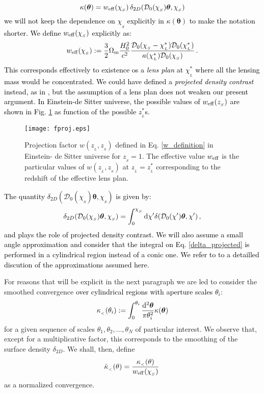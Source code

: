 \documentclass[twocolumn,aps,reprint, nofootinbib]{revtex4}
\newcommand{\Omegam}{{\Omega_\mathrm{m}}}
\newcommand{\dd}{{\rm d}}
\newcommand{\eff}{{\rm eff}}
\newcommand{\w}{{w_{\eff}}}
\newcommand{\bfth}{{\boldsymbol{\theta}}}
\newcommand{\hkappa}{\hat{\kappa}_{_<}}
\newcommand{\mD}{{\mathcal{D}_0}}
\newcommand{\pr}[1]{{\textcolor{black}{\textit{} #1}}}
\begin{document}
\begin{equation}
\label{kappa_tvm}
\kappa(\bfth) =  \w(\chi_{_S}) \, \delta_{2D}(\mD(\chi_{_S}) \bfth, \chi_{_S})
\end{equation}
\pr{we will not keep the dependence on $\chi_{_S}$ explicitly in $\kappa(\bfth)$  to make the notation shorter. We define $\w(\chi_{_S})$ explicitly as:}
\begin{equation}
\w(\chi_{_S}) := \frac{3}{2} \Omegam \frac{H_0^2}{c^2} \frac{\mD(\chi_{_S} - \chi_{_L}^*) \mD(\chi_{_L}^*)}{ a(\chi_{_L}^*)  \mD(\chi_{_S})} \, .
\end{equation}
\pr{This corresponds effectively to existence os a \emph{lens plan} at $\chi_{_L}^*$ where all the lensing mass would be concentrated. We could have defined a \emph{projected density contrast} instead, as in \cite{bernardeau2000construction}, but the assumption of a lens plan does not weaken our present argument. In Einstein-de Sitter universe, the possible values of $ \w( z_{_S})$ are shown in Fig. \ref{fproj} as function of the possible $z_{_L}^*$s.}

\begin{figure}[!ht]
\centering
\texttt{[image: fproj.eps]}
\caption{Projection factor  $w(z_{_L}, z_{_S})$ defined in Eq. \eqref{w_definition}  in Einstein- de Sitter universe for $z_{_S}=1$. The effective value $\w$ is the particular values of $w(z_{_L}, z_{_S})$ at $z_{_L} = z_{_L}^*$ corresponding to the redshift of the effective lens plan.}
\label{fproj}
\end{figure}

\pr{The quantity $\delta_{2D}(\mD(\chi_{_S}) \bfth, \chi_{_S})$ is given by:}
\begin{equation}
\label{delta_projected}
\delta_{2D}(\mD(\chi_{_S}) \bfth, \chi_{_S}) = \int_0^{\chi_{_S}} \dd \chi'  \delta(\mD(\chi') \bfth, \chi') \, ,
\end{equation}
\pr{and plays the role of projected density contrast. We will also assume a small angle approximation and consider that the integral on Eq. \eqref{delta_projected} is performed in a cylindrical region instead of a conic one. We refer to \cite{Bernardeau:1994hn, Bernardeau:1996un, bernardeau2000construction} to a detailled discution of the approximations assumed here}.

For reasons that will be explicit in the next paragraph we are led to consider the smoothed convergence \pr{over cylindrical regions with aperture scales $\theta_i$}:
\begin{equation}
\label{kappa_sup}
\kappa_{_<}(\theta_i) := \int_0^{\theta_i} \frac{\dd^2 \bfth}{\pi \theta_i^2} \kappa(\bfth) 
\end{equation}
for a given sequence of scales $\theta_1, \theta_2, \ldots, \theta_N$ of particular interest. We observe that, except for a multiplicative factor, this corresponds to the smoothing of the surface density $\delta_{2D}$. We shall, then, define
\begin{equation}
\label{hkappa}
\hkappa(\theta) = \frac{\kappa_{_<}(\theta)}{ \w(\chi_{_S}) } \, 
\end{equation}
as a normalized convergence. 
\end{document}
